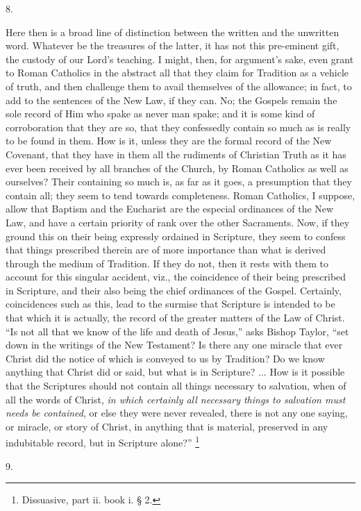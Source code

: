 8.

Here then is a broad line of distinction between the written and
the unwritten word. Whatever be the treasures of the latter, it has
not this pre-eminent gift, the custody of our Lord's teaching. I
might, then, for argument's sake, even grant to Roman Catholics in the
abstract all that they claim for Tradition as a vehicle of truth, and
then challenge them to avail themselves of the allowance; in fact, to
add to the sentences of the New Law, if they can. No; the Gospels
remain the sole record of Him who spake as never man spake; and it is
some kind of corroboration that they are so, that they confessedly
contain so much as is really to be found in them. How is it, unless
they are the formal record of the New Covenant, that they have in them
all the rudiments of Christian Truth as it has ever been
received by all branches of the Church, by Roman Catholics as well as
ourselves? Their containing so much is, as far as it goes, a
presumption that they contain all; they seem to tend towards
completeness. Roman Catholics, I suppose, allow that Baptism and the
Eucharist are the especial ordinances of the New Law, and have a
certain priority of rank over the other Sacraments. Now, if they
ground this on their being expressly ordained in Scripture, they seem
to confess that things prescribed therein are of more importance than
what is derived through the medium of Tradition. If they do not, then
it rests with them to account for this singular accident, viz., the
coincidence of their being prescribed in Scripture, and their also
being the chief ordinances of the Gospel. Certainly, coincidences such
as this, lead to the surmise that Scripture is intended to be that
which it is actually, the record of the greater matters of the Law of
Christ. ``Is not all that we know of the life and death of
Jesus,'' asks Bishop Taylor, ``set down in the writings of the
New Testament? Is there any one miracle that ever Christ did the
notice of which is conveyed to us by Tradition? Do we know anything
that Christ did or said, but what is in Scripture? ... How is it
possible that the Scriptures should not contain all things necessary
to salvation, when of all the words of Christ, \emph{in which certainly
all necessary things to salvation must needs be contained}, or else
they were never revealed, there is not any one saying, or miracle, or
story of Christ, in anything that is material, preserved in any
indubitable record, but in Scripture alone?'' \footnote{Dissuasive, part ii. book i. § 2.}

9.

